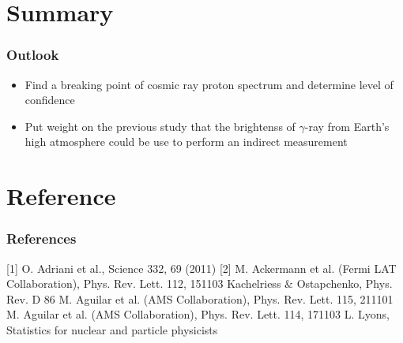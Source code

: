 \documentclass{beamer}
\begin{document}



\section{Summary}
\begin{frame}
\frametitle{Outlook}
\begin{itemize}
\item Find a breaking point of cosmic ray proton spectrum and determine level of confidence
\item Put weight on the previous study that the brightenss of $\gamma$-ray from Earth's high atmosphere could be use to perform an indirect measurement
\end{itemize}
\end{frame}




\section{} %

\section{Reference}
\begin{frame}
\frametitle{References}
[1] O. Adriani et al., Science 332, 69 (2011)
[2] M. Ackermann et al. (Fermi LAT Collaboration), Phys. Rev. Lett. 112, 151103 \newline
[3] Kachelriess $\&$ Ostapchenko, Phys. Rev. D 86 \newline
[4] M. Aguilar et al. (AMS Collaboration), Phys. Rev. Lett. 115, 211101 \newline
[5] M. Aguilar et al. (AMS Collaboration), Phys. Rev. Lett. 114, 171103 \newline
[6] L. Lyons, Statistics for nuclear and particle physicists
\end{frame}
\end{document}
